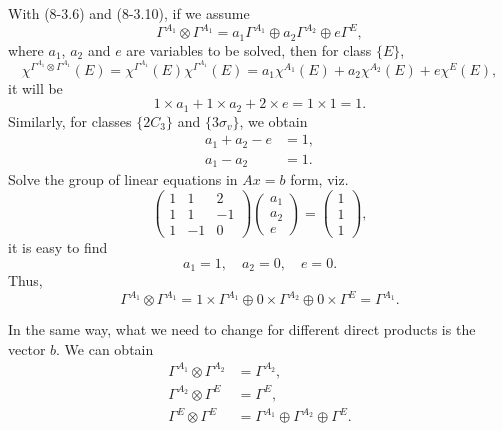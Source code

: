 \documentclass[a4paper]{book}
\begin{document}
\begin{solution}
\begin{enumerate}[label=(\alph*)]
		With (8-3.6) and (8-3.10), if we assume
		\begin{equation*}
			\Gamma^{A_1} \otimes \Gamma^{A_1} = a_1 \Gamma^{A_1} \oplus a_2 \Gamma^{A_2} \oplus e \Gamma^{E},
		\end{equation*}				
		where $a_1$, $a_2$ and $e$ are variables to be solved, then for class $\{E\}$,
		\begin{equation*}
			\chi^{\Gamma^{A_1}\otimes\Gamma^{A_1}}(E) = \chi^{\Gamma^{A_1}}(E) \chi^{\Gamma^{A_1}}(E) = a_1 \chi^{A_1}(E) + a_2 \chi^{A_2}(E) + e \chi^{E}(E),
		\end{equation*}
		it will be
		\begin{equation*}
			1 \times a_1 + 1 \times a_2 + 2 \times e = 1 \times 1 = 1.
		\end{equation*}
		Similarly, for classes $\{2C_3\}$ and $\{3\sigma_v\}$, we obtain
		\begin{align*}
			a_1 + a_2 - e &= 1 , \\
			a_1 - a_2 &= 1 .
		\end{align*}
		Solve the group of linear equations in $Ax=b$ form, viz.
		\begin{equation*}
			\begin{pmatrix}
				1 & 1 & 2 \\
				1 & 1 & -1 \\
				1 & -1 & 0
			\end{pmatrix}
			\begin{pmatrix}
				a_1 \\ a_2 \\ e
			\end{pmatrix} =
			\begin{pmatrix}
				1 \\ 1 \\ 1
			\end{pmatrix},
		\end{equation*}
		it is easy to find
		\begin{equation*}
			a_1 = 1 , \quad a_2 = 0 , \quad e = 0.
		\end{equation*}
		Thus,
		\begin{equation}
			\Gamma^{A_1} \otimes \Gamma^{A_1} = 1 \times \Gamma^{A_1} \oplus 0 \times \Gamma^{A_2} \oplus 0 \times \Gamma^{E} = \Gamma^{A_1}.
		\end{equation}
		
		In the same way, what we need to change for different direct products is the vector $b$. We can obtain
		\begin{align}
			\Gamma^{A_1}\otimes\Gamma^{A_2} &= \Gamma^{A_2}, \\
			\Gamma^{A_2}\otimes\Gamma^{E} &= \Gamma^{E}, \\
			\Gamma^{E}\otimes\Gamma^{E} &= \Gamma^{A_1} \oplus \Gamma^{A_2} \oplus \Gamma^{E}.
		\end{align}
		

\end{enumerate}
\end{solution}
\end{document}
